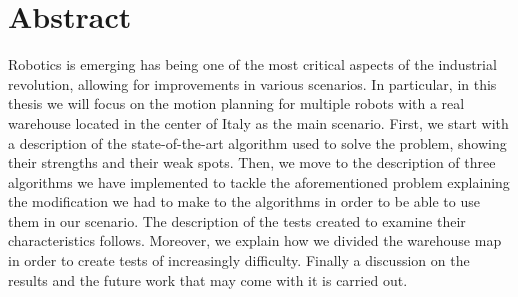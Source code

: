 \chapter{Abstract}
\label{ch:abstract}
Robotics is emerging has being one of the most critical aspects of the
industrial revolution, allowing for improvements in various scenarios. In
particular, in this thesis we will focus on the motion planning for multiple
robots with a real warehouse located in the center of Italy as the main
scenario. \newline
First, we start with a description of the state-of-the-art algorithm used to
solve the  problem, showing their strengths and their weak spots.
\newline
Then, we move to the description of three algorithms we have implemented to
tackle the aforementioned problem explaining the modification we had to make to
the algorithms in order to be able to use them in our scenario. \newline
The description of the tests created to examine their characteristics follows.
Moreover, we explain how we divided the warehouse map in order to create tests
of increasingly difficulty. \newline
Finally a discussion on the results and the future work that may come with it
is carried out. 

